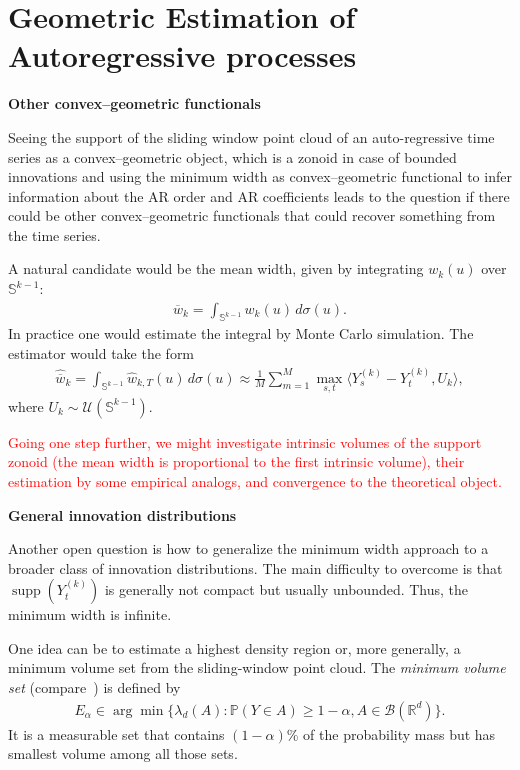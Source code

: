 \section{Geometric Estimation of Autoregressive processes}


\textbf{Other convex--geometric functionals}

Seeing the support of the sliding window point cloud of an auto-regressive time series as a convex--geometric object, which is a zonoid in case of bounded innovations and using the minimum width as convex--geometric functional to infer information about the AR order and AR coefficients leads to the question if there could be other convex--geometric functionals that could recover something from the time series.

A natural candidate would be the mean width, given by integrating $w_k(u)$ over $\mathbb{S}^{k-1}$:
\begin{align*}
    \overline{w}_k=\int_{\mathbb{S}^{k-1}}w_k(u)\,d\sigma(u).
\end{align*}
In practice one would estimate the integral by Monte Carlo simulation. The estimator would take the form
\begin{align*}
    \hat{\overline{w}}_k=\int_{\mathbb{S}^{k-1}}\hat{w}_{k,T}(u)\,d\sigma(u)\approx\frac{1}{M}\sum_{m=1}^{M}\max_{s,t}\langle Y_s^{(k)}-Y_t^{(k)},U_k\rangle,
\end{align*}
where $U_k\sim\mathcal{U}(\mathbb{S}^{k-1})$.

\textcolor{red}{Going one step further, we might investigate intrinsic volumes of the support zonoid (the mean width is proportional to the first intrinsic volume), their estimation by some empirical analogs, and convergence to the theoretical object.}

\textbf{General innovation distributions}

Another open question is how to generalize the minimum width approach to a broader class of innovation distributions. The main difficulty to overcome is that $\operatorname{supp}(Y_t^{(k)})$ is generally not compact but usually unbounded. Thus, the minimum width is infinite.

One idea can be to estimate a highest density region or, more generally, a minimum volume set from the sliding-window point cloud. The \textit{minimum volume set} (compare~\cite{JMLR:v7:scott06a}) is defined by
\begin{align*}
    E_{\alpha}\in\arg\min\{\lambda_d(A):\mathbb{P}(Y\in A)\ge1-\alpha,A\in\mathcal{B}(\mathbb{R}^d)\}.
\end{align*}
It is a measurable set that contains $(1-\alpha)\%$ of the probability mass but has smallest volume among all those sets.


